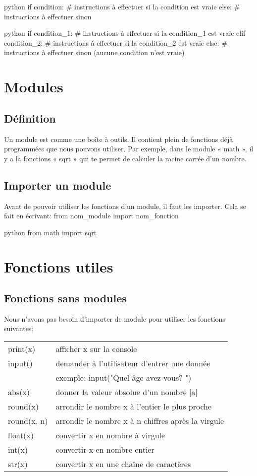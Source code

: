 \documentclass[a4paper,11pt]{article}
\begin{document}
\begin{code}{python}
if condition:
  # instructions à effectuer si la condition est vraie
else:
  # instructions à effectuer sinon
\end{code}

\begin{code}{python}
if condition_1:
  # instructions à effectuer si la condition_1 est vraie
elif condition_2:
  # instructions à effectuer si la condition_2 est vraie
else:
  # instructions à effectuer sinon (aucune condition n'est vraie)
\end{code}

\section{Modules}

\subsection{Définition}
Un module est comme une boîte à outils. Il contient plein de fonctions déjà programmées que nous pouvons utiliser.
Par exemple, dans le module « math », il y a la fonctions « sqrt » qui te permet de calculer la racine carrée d’un nombre.

\subsection{Importer un module}
Avant de pouvoir utiliser les fonctions d’un module, il faut les importer.
Cela se fait en écrivant: from nom\_module import nom\_fonction
\begin{code}{python}
from math import sqrt
\end{code}

\section{Fonctions utiles}
\subsection{Fonctions sans modules}
Nous n'avons pas besoin d'importer de module pour utiliser les fonctions suivantes:\par
\begin{tabular}{l l}
print(x) & afficher x sur la console\\
input() & demander à l'utilisateur d'entrer une donnée\\
  & exemple: input("Quel âge avez-vous? ")\\
abs(x) & donner la valeur absolue d'un nombre |a| \\
round(x) & arrondir le nombre x à l'entier le plus proche\\
round(x, n) & arrondir le nombre x à n chiffres après la virgule\\
float(x) & convertir x en nombre à virgule\\
int(x) & convertir x en nombre entier\\
str(x) & convertir x en une chaîne de caractères\\
\end{tabular}
\end{document}
